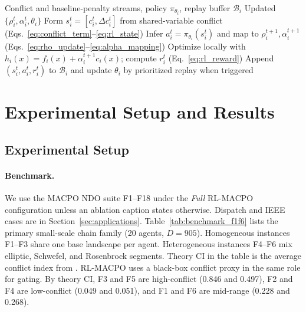 \documentclass[conference]{IEEEtran}
\begin{document}
\begin{algorithm}[t]
  \footnotesize
  \caption{Adaptive Penalty Control with RL Default (Abstract)}
  \label{alg:rl_penalty_update}
  \begin{algorithmic}[1]
  \Require Conflict and baseline-penalty streams, policy $\pi_{\theta_i}$, replay buffer $\mathcal{B}_i$
  \Ensure Updated $\{\rho_i^t,\alpha_i^t,\theta_i\}$
    \State Form $s_i^t=[c_i^t,\Delta c_i^t]$ from shared-variable conflict (Eqs.~\eqref{eq:conflict_term}--\eqref{eq:rl_state})
    \State Infer $a_i^t=\pi_{\theta_i}(s_i^t)$ and map to $\rho_i^{t+1},\alpha_i^{t+1}$ (Eqs.~\eqref{eq:rho_update}--\eqref{eq:alpha_mapping})
    \State Optimize locally with $h_i(x)=f_i(x)+\alpha_i^{t+1}c_i(x)$; compute $r_i^t$ (Eq.~\eqref{eq:rl_reward})
    \State Append $(s_i^t,a_i^t,r_i^t)$ to $\mathcal{B}_i$ and update $\theta_i$ by prioritized replay when triggered
  \EndFor
  \end{algorithmic}
\end{algorithm}

\section{Experimental Setup and Results}\label{sec:experiments}
\subsection{Experimental Setup}
\paragraph{Benchmark.} We use the MACPO NDO suite F1--F18 \cite{ref_macpo} under the \emph{Full} RL-MACPO configuration unless an ablation caption states otherwise. Dispatch and IEEE cases are in Section~\ref{sec:applications}. Table~\ref{tab:benchmark_f1f6} lists the primary small-scale chain family (20 agents, $D{=}905$). Homogeneous instances F1--F3 share one base landscape per agent. Heterogeneous instances F4--F6 mix elliptic, Schwefel, and Rosenbrock segments. Theory CI in the table is the average conflict index from \cite{ref_macpo}. RL-MACPO uses a black-box conflict proxy in the same role for gating. By theory CI, F3 and F5 are high-conflict (0.846 and 0.497), F2 and F4 are low-conflict (0.049 and 0.051), and F1 and F6 are mid-range (0.228 and 0.268).
\end{document}

